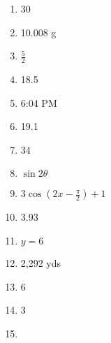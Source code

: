\documentclass[../uilmath.tex]{subfiles}
\begin{document}
\begin{enumerate}[label=\bfseries\arabic*.]
    \item %
    30

    \item %
    10.008 g 

    \item %
    $\frac{5}{2}$

    \item %
    18.5

    \item %
    6:04 PM 

    \item %
    19.1

    \item %
    34

    \item %
    $\sin2\theta$

    \item %
    $3\cos(2x-\frac{\pi}{2})+1$

    \item %
    3.93

    \item %
    $y=6$

    \item %
    2,292 yds 

    \item %
    6

    \item %
    3

    \item %
    
\end{enumerate}
\end{document}
